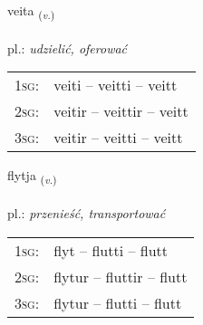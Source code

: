 \documentclass[frontgrid, backgrid]{flacards}\usepackage[]{graphicx}\usepackage[]{xcolor}
\begin{document}
{veita \small{\textsubscript{(\textit{v.})}} \\[1ex] %
\textphonetic{[veiːta]} \\
pl.: \emph{udzielić, oferować} \\  [2ex]
\renewcommand*{\arraystretch}{0.8}
\begin{tabular}{p{1cm}l}
\textsc{1sg}: & veiti -- veitti -- veitt \\ 
\textsc{2sg}: & veitir -- veittir -- veitt \\ 
\textsc{3sg}: & veitir -- veitti -- veitt \\ 
\end{tabular}
}

\renewcommand{\flhead}{\vskip5pt \fboxsep=0pt {\small\bfseries\footnotesize Sagnorð | Verb}}
\renewcommand{\fcfoot}{\vskip5pt \fboxsep=0pt \hspace{2pt}{\small\bfseries\footnotesize 1K}}

\renewcommand{\blhead}{\vskip5pt {\small\bfseries\footnotesize Sagnorð | Verb }}
\renewcommand{\bcfoot}{\vskip5pt \hspace{2pt}{\small\bfseries\footnotesize 1K}}


{flytja \small{\textsubscript{(\textit{v.})}} \\[1ex] %
\textphonetic{[flɪːtja]} \\
pl.: \emph{przenieść, transportować} \\  [2ex]
\renewcommand*{\arraystretch}{0.8}
\begin{tabular}{p{1cm}l}
\textsc{1sg}: & flyt -- flutti -- flutt \\ 
\textsc{2sg}: & flytur -- fluttir -- flutt \\ 
\textsc{3sg}: & flytur -- flutti -- flutt \\ 
\end{tabular}
}

\renewcommand{\flhead}{\vskip5pt \fboxsep=0pt {\small\bfseries\footnotesize Nafnorð | Noun}}
\renewcommand{\fcfoot}{\vskip5pt \fboxsep=0pt \hspace{2pt}{\small\bfseries\footnotesize 1K}}
\end{document}
